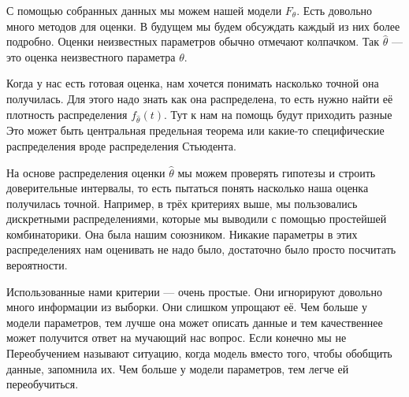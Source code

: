 \documentclass[12pt, a4paper, oneside]{article}
\begin{document}
С помощью собранных данных мы можем  нашей модели $F_{\theta}$.	Есть довольно много методов для оценки. В будущем мы будем обсуждать каждый из них более подробно. Оценки неизвестных параметров обычно отмечают колпачком. Так $\hat{\theta}$ --- это оценка неизвестного параметра $\theta$. 

Когда у нас есть готовая оценка, нам хочется понимать насколько точной она получилась. Для этого надо знать как она распределена, то есть нужно найти её плотность распределения $f_{\hat \theta} (t)$. Тут к нам на помощь будут приходить разные  Это может быть центральная предельная теорема или какие-то специфические распределения вроде распределения Стьюдента.

На основе распределения оценки $\hat \theta$ мы можем проверять гипотезы и строить доверительные интервалы, то есть пытаться понять насколько наша оценка получилась точной. Например, в трёх критериях выше, мы пользовались дискретными распределениями, которые мы выводили с помощью простейшей комбинаторики. Она была нашим союзником. Никакие параметры в этих распределениях нам оценивать не надо было, достаточно было просто посчитать вероятности.

Использованные нами критерии --- очень простые. Они игнорируют довольно много информации из выборки. Они слишком упрощают её. Чем больше у модели параметров, тем лучше она может описать данные и тем качественнее может получится ответ на мучающий нас вопрос. Если конечно мы не  Переобучением называют ситуацию, когда модель вместо того, чтобы обобщить данные, запомнила их. Чем больше у модели параметров, тем легче ей переобучиться. 
\end{document}
